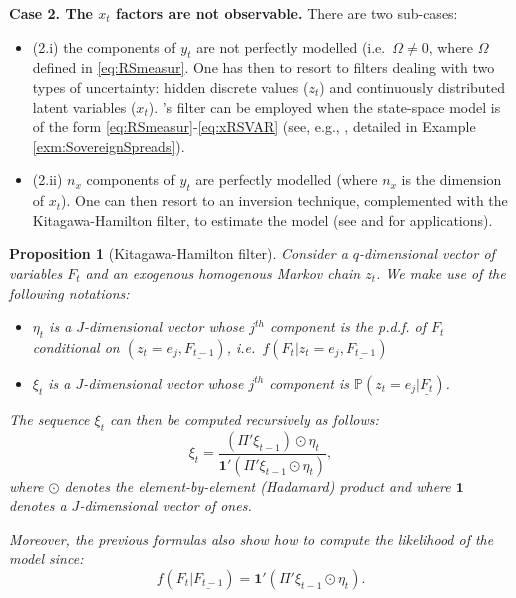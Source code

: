 \documentclass[
  12pt,
]{book}
\providecommand{\tightlist}{%
  \setlength{\itemsep}{0pt}\setlength{\parskip}{0pt}}
\newtheorem{proposition}{Proposition}[chapter]
\theoremstyle{definition}
\theoremstyle{definition}
\theoremstyle{definition}
\theoremstyle{definition}
\theoremstyle{remark}
\begin{document}
\textbf{Case 2. The \(x_t\) factors are not observable.} There are two sub-cases:

\begin{itemize}
\tightlist
\item
  (2.i) the components of \(y_t\) are not perfectly modelled (i.e.~\(\Omega \ne 0\), where \(\Omega\) defined in \eqref{eq:RSmeasur}. One has then to resort to filters dealing with two types of uncertainty: hidden discrete values (\(z_t\)) and continuously distributed latent variables (\(x_t\)). \citet{Kim_1994}'s filter can be employed when the state-space model is of the form \eqref{eq:RSmeasur}-\eqref{eq:xRSVAR} (see, e.g., \citet{Monfort_Renne_2014}, detailed in Example \ref{exm:SovereignSpreads}).
\item
  (2.ii) \(n_x\) components of \(y_t\) are perfectly modelled (where \(n_x\) is the dimension of \(x_t\)). One can then resort to an inversion technique, complemented with the Kitagawa-Hamilton filter, to estimate the model (see \citet{Monfort_Renne_2013} and \citet{Renne_2017} for applications).
\end{itemize}

\begin{proposition}[Kitagawa-Hamilton filter]
\protect\hypertarget{prp:KitagHamilton}{}\label{prp:KitagHamilton}Consider a \(q\)-dimensional vector of variables \(F_t\) and an exogenous homogenous Markov chain \(z_t\). We make use of the following notations:

\begin{itemize}
\tightlist
\item
  \(\eta_t\) is a \(J\)-dimensional vector whose \(j^{th}\) component is the p.d.f. of \(F_t\) conditional on \((z_t = e_j,\underline{F_{t-1}})\), i.e.~\(f(F_t|z_t=e_j,\underline{F_{t-1}})\)
\item
  \(\xi_{t}\) is a \(J\)-dimensional vector whose \(j^{th}\) component is \(\mathbb{P}(z_t = e_j|\underline{F_t})\).
\end{itemize}

The sequence \(\xi_{t}\) can then be computed recursively as follows:
\begin{equation}
\xi_t = \frac{(\Pi' \xi_{t-1}) \odot \eta_t}{\mathbf{1}'(\Pi' \xi_{t-1} \odot \eta_t)},\label{eq:KHfilter}
\end{equation}
where \(\odot\) denotes the element-by-element (Hadamard) product and where \(\mathbf{1}\) denotes a \(J\)-dimensional vector of ones.

Moreover, the previous formulas also show how to compute the likelihood of the model since:
\begin{equation}
f(F_t|\underline{F_{t-1}})=\mathbf{1}'(\Pi' \xi_{t-1} \odot \eta_t).\label{eq:KHlikelihood}
\end{equation}
\end{proposition}
\end{document}
